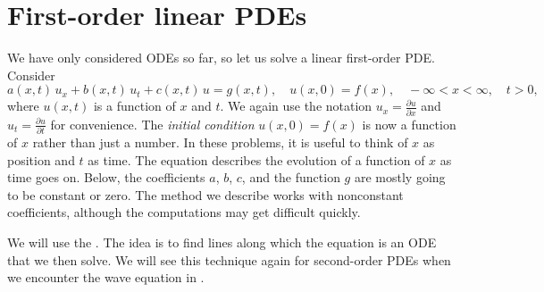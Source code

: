 \sectionnewpage
\section{First-order linear PDEs}
\label{fopde:section}


We have only considered ODEs so far, so let us solve a linear first-order
PDE\@.  Consider
\begin{equation*}
a(x,t) \, u_x + b(x,t) \, u_t + c(x,t) \, u = g(x,t), \quad u(x,0) = f(x) , \quad -\infty < x < \infty,
\quad t > 0 ,
\end{equation*}
where $u(x,t)$ is a function of $x$ and $t$.
We again use the notation $u_x = \frac{\partial u}{\partial x}$ and
$u_t = \frac{\partial u}{\partial t}$ for convenience.
The \emph{initial condition}
$u(x,0) = f(x)$ is now a function of $x$ rather than just a number.
In these problems, it is useful to think of $x$ as position and $t$ as time.
The equation describes the evolution of a function of $x$ as
time goes on.
Below, the coefficients $a$, $b$, $c$, and the function $g$
are mostly going to be constant or zero.
The method we describe works with nonconstant coefficients,
although the computations may get difficult quickly.

We will use the
\emph{}.
The idea is to find lines along which the equation is
an ODE that we then solve.
We will see this technique again for second-order PDEs
when we encounter the wave equation in .

